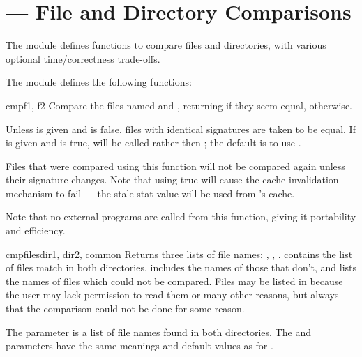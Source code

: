 \section{ ---
         File and Directory Comparisons}



The  module defines functions to compare files and
directories, with various optional time/correctness trade-offs.

The  module defines the following functions:

\begin{funcdesc}{cmp}{f1, f2}
Compare the files named  and , returning  if
they seem equal,  otherwise.

Unless  is given and is false, files with identical
 signatures are taken to be equal.  If
 is given and is true,
 will be called rather then
; the default is to use .

Files that were compared using this function will not be compared again
unless their  signature changes. Note that using
 true will cause the cache invalidation mechanism to 
fail --- the stale stat value will be used from 's 
cache.

Note that no external programs are called from this function, giving it
portability and efficiency.
\end{funcdesc}

\begin{funcdesc}{cmpfiles}{dir1, dir2, common}
Returns three lists of file names: , ,
.   contains the list of files match in both
directories,  includes the names of those that don't,
and  lists the names of files which could not be
compared.  Files may be listed in  because the user may
lack permission to read them or many other reasons, but always that
the comparison could not be done for some reason.

The  parameter is a list of file names found in both directories.
The  and  parameters have the same
meanings and default values as for .
\end{funcdesc}

